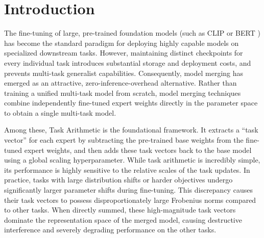 \section{Introduction}
\label{sec:intro}

The fine-tuning of large, pre-trained foundation models (such as CLIP \cite{radford2021clip} or BERT \cite{devlin2018bert}) has become the standard paradigm for deploying highly capable models on specialized downstream tasks. However, maintaining distinct checkpoints for every individual task introduces substantial storage and deployment costs, and prevents multi-task generalist capabilities. Consequently, model merging \cite{wortsman2022model, choshen2022fusing} has emerged as an attractive, zero-inference-overhead alternative. Rather than training a unified multi-task model from scratch, model merging techniques combine independently fine-tuned expert weights directly in the parameter space to obtain a single multi-task model.

Among these, Task Arithmetic \cite{ilharco2023editing} is the foundational framework. It extracts a ``task vector'' for each expert by subtracting the pre-trained base weights from the fine-tuned expert weights, and then adds these task vectors back to the base model using a global scaling hyperparameter. While task arithmetic is incredibly simple, its performance is highly sensitive to the relative scales of the task updates. In practice, tasks with large distribution shifts or harder objectives undergo significantly larger parameter shifts during fine-tuning. This discrepancy causes their task vectors to possess disproportionately large Frobenius norms compared to other tasks. When directly summed, these high-magnitude task vectors dominate the representation space of the merged model, causing destructive interference and severely degrading performance on the other tasks.

